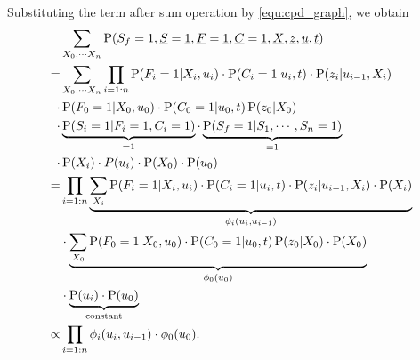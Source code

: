 Substituting the term after sum operation by \ref{equ:cpd_graph}, we obtain 
\begin{equation}
\begin{split}
 &\sum\limits_{ X_0,\cdots X_n } \operatorname*{\text{P}}( S_f = 1, \underline{S} = \underline{1}, \underline{F} = \underline{1}, \underline{C} = \underline{1}, \underline{X}, \underline{z},\underline{u}, \underline{t}) \\
=&\sum\limits_{ X_0,\cdots X_n } \prod\limits_{i = 1:n} \operatorname*{\text{P}}(F_i=1 | X_i, u_i) \cdot \operatorname*{\text{P}}(C_i = 1 | u_i, t)\cdot   \operatorname*{\text{P}}(z_i|u_{i-1}, X_i) \\
              \cdot & \operatorname*{\text{P}}(F_0=1 | X_0, u_0)\cdot \operatorname*{\text{P}}(C_0=1 | u_0, t)  \operatorname*{\text{P}}(z_0|X_0 )\\
              \cdot & \underbrace{\operatorname*{\text{P}}(S_i = 1 | F_i = 1, C_i=1)}_{=1} \cdot  \underbrace{\operatorname*{\text{P}}(S_f=1| S_1, \cdots, S_n = 1)}_{=1}  \\
              \cdot &\operatorname*{\text{P}}(X_i)\cdot P(u_i) \cdot\operatorname*{\text{P}}(X_0) \cdot \operatorname*{\text{P}}(u_0) \\
=&  \prod\limits_{i = 1:n} \underbrace{   \sum\limits_{ X_i} \operatorname*{\text{P}}(F_i=1 | X_i, u_i) \cdot \operatorname*{\text{P}}(C_i = 1 | u_i, t)\cdot   \operatorname*{\text{P}}(z_i|u_{i-1}, X_i) \cdot \operatorname*{\text{P}}(X_i) }_{\phi_i(u_i, u_{i-1}) } \\ 
  & \cdot \underbrace{ \sum\limits_{ X_0} \operatorname*{\text{P}}(F_0 =1 | X_0, u_0)\cdot \operatorname*{\text{P}}(C_0=1 | u_0, t)  \operatorname*{\text{P}}(z_0|X_0 ) \cdot \operatorname*{\text{P}}(X_0) }_{\phi_0(u_0)} \\ 
  &  \cdot \underbrace{ \operatorname*{\text{P}}(u_i) \cdot \operatorname*{\text{P}}(u_0) }_{\text{constant}} \\
  \propto &  \prod\limits_{i = 1:n} \phi_i(u_i, u_{i-1}) \cdot \phi_0(u_0).
\end{split}
\end{equation}

